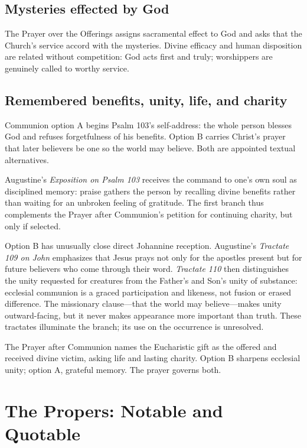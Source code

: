\subsection*{Mysteries effected by God\enspace{}}

The Prayer over the Offerings assigns sacramental effect to God and asks that the Church's service accord with the mysteries. Divine efficacy and human disposition are related without competition: God acts first and truly; worshippers are genuinely called to worthy service.

\subsection*{Remembered benefits, unity, life, and charity\enspace{}}

Communion option A begins Psalm 103's self-address: the whole person blesses God and refuses forgetfulness of his benefits. Option B carries Christ's prayer that later believers be one so the world may believe. Both are appointed textual alternatives.

Augustine's \emph{Exposition on Psalm 103} receives the command to one's own soul as disciplined memory: praise gathers the person by recalling divine benefits rather than waiting for an unbroken feeling of gratitude. The first branch thus complements the Prayer after Communion's petition for continuing charity, but only if selected.

Option B has unusually close direct Johannine reception. Augustine's \emph{Tractate 109 on John} emphasizes that Jesus prays not only for the apostles present but for future believers who come through their word. \emph{Tractate 110} then distinguishes the unity requested for creatures from the Father's and Son's unity of substance: ecclesial communion is a graced participation and likeness, not fusion or erased difference. The missionary clause---that the world may believe---makes unity outward-facing, but it never makes appearance more important than truth. These tractates illuminate the branch; its use on the occurrence is unresolved.

The Prayer after Communion names the Eucharistic gift as the offered and received divine victim, asking life and lasting charity. Option B sharpens ecclesial unity; option A, grateful memory. The prayer governs both.

\section*{The Propers: Notable and Quotable}

